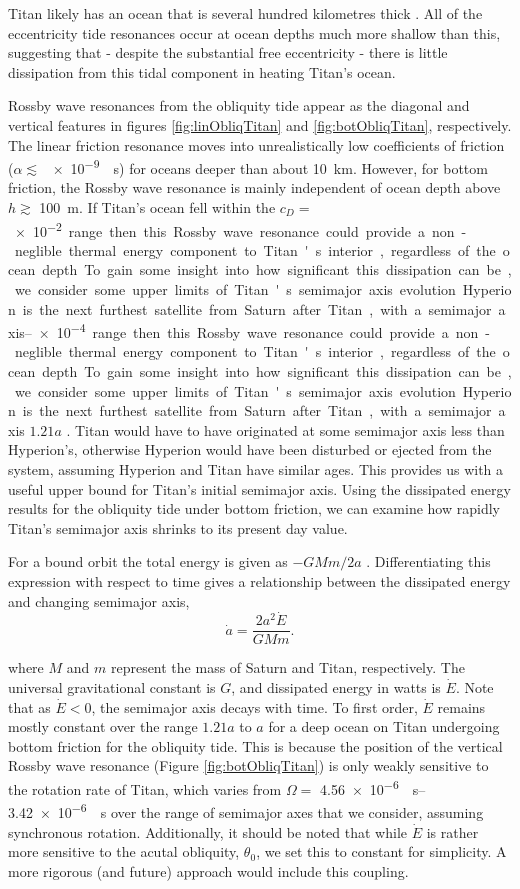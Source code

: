 Titan likely has an ocean that is several hundred kilometres thick \citep{sohl2003interior}. All of the eccentricity tide resonances occur at ocean depths much more shallow than this, suggesting that - despite the substantial free eccentricity - there is little dissipation from this tidal component in heating Titan's ocean.

Rossby wave resonances from the obliquity tide appear as the diagonal and vertical features in figures \ref{fig:linObliqTitan} and \ref{fig:botObliqTitan}, respectively. The linear friction resonance moves into unrealistically low coefficients of friction ($\alpha \lesssim$ \SI{e-9}{\per\second}) for oceans deeper than about \SI{10}{\kilo\metre}. However, for bottom friction, the Rossby wave resonance is mainly independent of ocean depth above $h \gtrsim$ \SI{100}{\metre}. If Titan's ocean fell within the $c_D =$ \SIrange{e-2}{e-4} range then this Rossby wave resonance could provide a non-neglible thermal energy component to Titan's interior, regardless of the ocean depth. To gain some insight into how significant this dissipation can be, we consider some upper limits of Titan's semimajor axis evolution.

Hyperion is the next furthest satellite from Saturn after Titan, with a semimajor axis  $1.21 a$ \citep{sears1995tidal}. Titan would have to have originated at some semimajor axis less than Hyperion's, otherwise Hyperion would have been disturbed or ejected from the system, assuming Hyperion and Titan have similar ages. This provides us with a useful upper bound for Titan's  initial semimajor axis. Using the dissipated energy results for the obliquity tide under bottom friction, we can examine how rapidly Titan's semimajor axis shrinks to its present day value.

For a bound orbit the total energy is given as $-GMm/2a$ \citep{goldreich1966q}. Differentiating this expression with respect to time gives a relationship between the dissipated energy and changing semimajor axis,
\begin{equation}
\dot{a} = \dfrac{2a^2 \dot{E}}{GM m}.
\label{eq:adot}
\end{equation}

where $M$ and $m$ represent the mass of Saturn and Titan, respectively. The universal gravitational constant is $G$, and dissipated energy in watts is $\dot{E}$. Note that as $\dot{E} < 0$, the semimajor axis decays with time. To first order, $\dot{E}$ remains mostly constant over the range $1.21 a$ to $a$ for a deep ocean on Titan undergoing bottom friction for the obliquity tide. This is because the position of the vertical Rossby wave resonance (Figure \ref{fig:botObliqTitan}) is only weakly sensitive to the rotation rate of Titan, which varies from $\Omega =$ \SIrange{4.56e-6}{3.42e-6}{\per\second} over the range of semimajor axes that we consider, assuming synchronous rotation. Additionally, it should be noted that while $\dot{E}$ is rather more sensitive to the acutal obliquity, $\theta_0$, we set this to constant for simplicity. A more rigorous (and future) approach would include this coupling.

